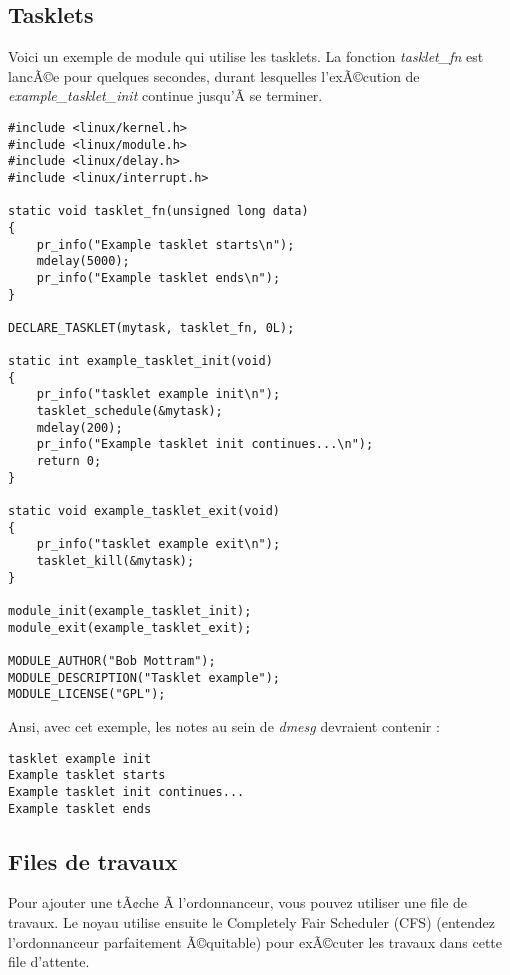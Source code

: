 \documentclass[11pt]{article}
\begin{document}
\subsection*{Tasklets}
\label{sec-14-1}

Voici un exemple de module qui utilise les tasklets. La fonction \emph{tasklet\_fn} est lancÃ©e pour quelques secondes, durant lesquelles l'exÃ©cution de \emph{example\_tasklet\_init} continue jusqu'Ã  se terminer.

\begin{verbatim}
#include <linux/kernel.h>
#include <linux/module.h>
#include <linux/delay.h>
#include <linux/interrupt.h>

static void tasklet_fn(unsigned long data)
{
    pr_info("Example tasklet starts\n");
    mdelay(5000);
    pr_info("Example tasklet ends\n");
}

DECLARE_TASKLET(mytask, tasklet_fn, 0L);

static int example_tasklet_init(void)
{
    pr_info("tasklet example init\n");
    tasklet_schedule(&mytask);
    mdelay(200);
    pr_info("Example tasklet init continues...\n");
    return 0;
}

static void example_tasklet_exit(void)
{
    pr_info("tasklet example exit\n");
    tasklet_kill(&mytask);
}

module_init(example_tasklet_init);
module_exit(example_tasklet_exit);

MODULE_AUTHOR("Bob Mottram");
MODULE_DESCRIPTION("Tasklet example");
MODULE_LICENSE("GPL");
\end{verbatim}

Ansi, avec cet exemple, les notes au sein de \emph{dmesg} devraient contenir :

\begin{verbatim}
tasklet example init
Example tasklet starts
Example tasklet init continues...
Example tasklet ends
\end{verbatim}

\subsection*{Files de travaux}
\label{sec-14-2}

Pour ajouter une tÃ¢che Ã  l'ordonnanceur, vous pouvez utiliser une file de travaux. Le noyau utilise ensuite le Completely Fair Scheduler (CFS) (entendez l'ordonnanceur parfaitement Ã©quitable) pour exÃ©cuter les travaux dans cette file d'attente.
\end{document}

